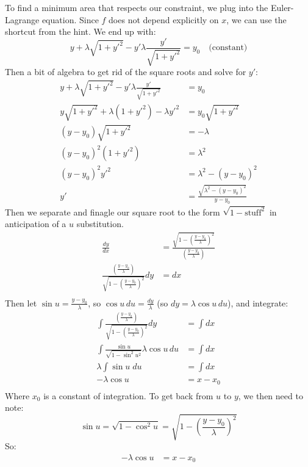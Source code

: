\documentclass{article}
\begin{document}
{To find a minimum area that respects our constraint, we plug into the Euler-Lagrange equation. Since $f$ does not depend explicitly on $x$, we can use the shortcut from the hint. We end up with:
$$
y + \lambda \sqrt{1 + y'^2} - y' \lambda \frac{y'}{\sqrt{1 + y'^2}} = y_0 \quad\text{(constant)}
$$
Then a bit of algebra to get rid of the square roots and solve for $y'$:
\begin{align*}
    y + \lambda \sqrt{1 + y'^2} - y' \lambda \frac{y'}{\sqrt{1 + y'^2}} &= y_0 \\
    y\sqrt{1 + y'^2} + \lambda (1 + y'^2) - \lambda y'^2 &= y_0 \sqrt{1 + y'^2} \\
    (y - y_0) \sqrt{1 + y'^2} &= -\lambda \\
    (y - y_0)^2 (1 + y'^2) &= \lambda^2 \\
    (y - y_0)^2 y'^2 &= \lambda^2 - (y - y_0)^2 \\
    y' &= \frac{ \sqrt{ \lambda^2 - (y - y_0)^2 } }{y - y_0}
\end{align*}
Then we separate and finagle our square root to the form $\sqrt{ 1 - \text{stuff}^2}$ in anticipation of a $u$ substitution.
\begin{align*}
    \frac{dy}{dx} &= \frac{ \sqrt{ 1 - \left( \frac{y - y_0}{\lambda} \right)^2 } }{\left( \frac{y - y_0}{\lambda} \right)} \\
    \frac{\left( \frac{y - y_0}{\lambda} \right)}{\sqrt{ 1 - \left( \frac{y - y_0}{\lambda} \right)^2 }}dy &= dx \\
\end{align*}
Then let $\sin u = \tfrac{y - y_0}{\lambda}$, so $\cos u \, du = \frac{dy}{\lambda}$ (so $dy = \lambda \cos u \, du$), and integrate:
\begin{align*}
    \int \frac{\left( \frac{y - y_0}{\lambda} \right)}{\sqrt{ 1 - \left( \frac{y - y_0}{\lambda} \right)^2 }} dy &= \int dx \\
    \int \frac{ \sin u }{\sqrt{ 1 - \sin^2 u^2 }} \lambda \cos u \, du &= \int dx \\
    \lambda \int \sin u \; du &= \int dx \\
    -\lambda \cos u &= x - x_0 \\
\end{align*}
Where $x_0$ is a constant of integration. To get back from $u$ to $y$, we then need to note:
$$
\sin u = \sqrt{ 1 - \cos^2 u } = \sqrt{ 1 -  \left( \frac{y - y_0}{\lambda} \right)^2 }
$$
So:
\begin{align*}
    -\lambda \cos u &= x - x_0 \\

\end{align*}}
\end{document}
